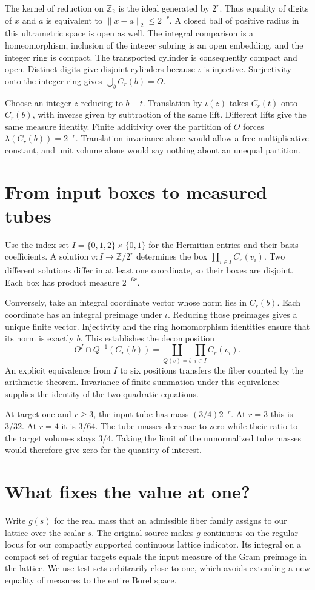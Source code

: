 \documentclass[12pt,letterpaper]{article}
\begin{document}
The kernel of reduction on $\mathbb Z_2$ is the ideal generated by $2^r$. Thus equality of digits of $x$ and $a$ is equivalent to $\lVert x-a\rVert_2\le 2^{-r}$. A closed ball of positive radius in this ultrametric space is open as well. The integral comparison is a homeomorphism, inclusion of the integer subring is an open embedding, and the integer ring is compact. The transported cylinder is consequently compact and open. Distinct digits give disjoint cylinders because $\iota$ is injective. Surjectivity onto the integer ring gives $\bigcup_bC_r(b)=O$.

Choose an integer $z$ reducing to $b-t$. Translation by $\iota(z)$ takes $C_r(t)$ onto $C_r(b)$, with inverse given by subtraction of the same lift. Different lifts give the same measure identity. Finite additivity over the partition of $O$ forces $\lambda(C_r(b))=2^{-r}$. Translation invariance alone would allow a free multiplicative constant, and unit volume alone would say nothing about an unequal partition.
\section{From input boxes to measured tubes}
Use the index set $I=\{0,1,2\}\times\{0,1\}$ for the Hermitian entries and their basis coefficients. A solution $v:I\to\mathbb Z/2^r$ determines the box $\prod_{i\in I}C_r(v_i)$. Two different solutions differ in at least one coordinate, so their boxes are disjoint. Each box has product measure $2^{-6r}$.

Conversely, take an integral coordinate vector whose norm lies in $C_r(b)$. Each coordinate has an integral preimage under $\iota$. Reducing those preimages gives a unique finite vector. Injectivity and the ring homomorphism identities ensure that its norm is exactly $b$. This establishes the decomposition
\[
 O^I\cap Q^{-1}(C_r(b))=
 \coprod_{Q(v)=b}\prod_{i\in I}C_r(v_i).
\]
An explicit equivalence from $I$ to six positions transfers the fiber counted by the arithmetic theorem. Invariance of finite summation under this equivalence supplies the identity of the two quadratic equations.

At target one and $r\ge3$, the input tube has mass $(3/4)2^{-r}$. At $r=3$ this is $3/32$. At $r=4$ it is $3/64$. The tube masses decrease to zero while their ratio to the target volumes stays $3/4$. Taking the limit of the unnormalized tube masses would therefore give zero for the quantity of interest.
\section{What fixes the value at one?}
Write $g(s)$ for the real mass that an admissible fiber family assigns to our lattice over the scalar $s$. The original source makes $g$ continuous on the regular locus for our compactly supported continuous lattice indicator. Its integral on a compact set of regular targets equals the input measure of the Gram preimage in the lattice. We use test sets arbitrarily close to one, which avoids extending a new equality of measures to the entire Borel space.
\end{document}
